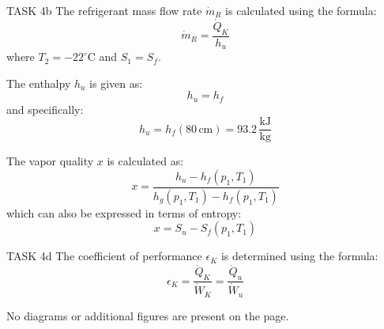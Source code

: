 TASK 4b  
The refrigerant mass flow rate \( \dot{m}_R \) is calculated using the formula:  
\[
\dot{m}_R = \frac{\dot{Q}_K}{h_u}
\]  
where \( T_2 = -22^\circ\text{C} \) and \( S_1 = S_f \).  

The enthalpy \( h_u \) is given as:  
\[
h_u = h_f
\]  
and specifically:  
\[
h_u = h_f(80 \, \text{cm}) = 93.2 \, \frac{\text{kJ}}{\text{kg}}
\]  

The vapor quality \( x \) is calculated as:  
\[
x = \frac{h_u - h_f(p_1, T_1)}{h_g(p_1, T_1) - h_f(p_1, T_1)}
\]  
which can also be expressed in terms of entropy:  
\[
x = S_u - S_f(p_1, T_1)
\]  

TASK 4d  
The coefficient of performance \( \epsilon_K \) is determined using the formula:  
\[
\epsilon_K = \frac{\dot{Q}_K}{\dot{W}_K} = \frac{\dot{Q}_u}{\dot{W}_u}
\]  

No diagrams or additional figures are present on the page.